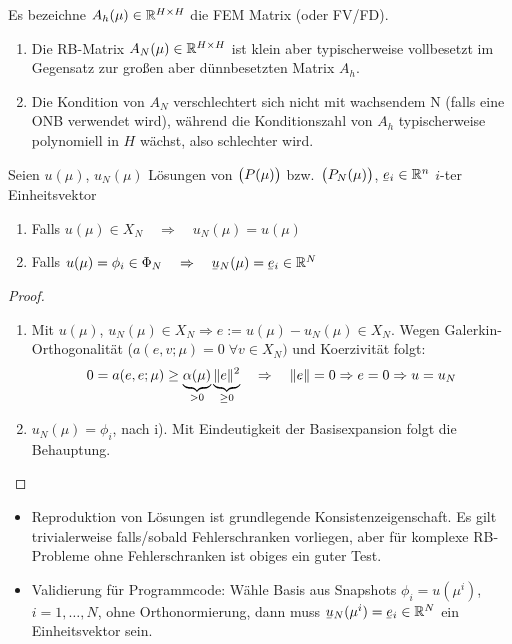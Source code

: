 \begin{bem}
	Es bezeichne $A_h(\mu) \in \mathbb{R}^{H \times H}$ die FEM Matrix (oder FV/FD).
	\begin{enumerate}
		\item Die RB-Matrix $A_N(\mu) \in \mathbb{R}^{H \times H}$ ist klein aber typischerweise vollbesetzt im Gegensatz zur großen aber dünnbesetzten Matrix $A_h$.
		\item Die Kondition von $A_N$ verschlechtert sich nicht mit wachsendem N (falls eine ONB verwendet wird), während die Konditionszahl von $A_h$ typischerweise polynomiell in $H$ wächst, also schlechter wird.
	\end{enumerate}
\end{bem}

\begin{satz} \label{3.8}
	Seien $u(\mu)$, $u_N(\mu)$ Lösungen von $\big(P(\mu)\big)$ bzw.\ $\big(P_N(\mu)\big)$, $\ubar e_i \in \R^n$ $i$-ter Einheitsvektor
	\begin{enumerate}
		\item Falls $u(\mu) \in X_N \quad \Rightarrow \quad u_N(\mu) = u(\mu)$
		\item Falls $u(\mu) = \phi_i \in \Phi_N \quad \Rightarrow \quad \ubar u_N(\mu) = \ubar e_i \in \R^N$
	\end{enumerate}

	\begin{proof} \beginwithlistbew
		\begin{enumerate}
			\item Mit $u(\mu)$, $u_N(\mu) \in X_N \Rightarrow e := u(\mu) - u_N(\mu) \in X_N$.
				Wegen Galerkin-Orthogonalität ($a(e,v;\mu) = 0 \; \forall v \in X_N)$ und Koerzivität folgt:
				\[
					0 = a(e,e;\mu) \geq \underbrace{\alpha(\mu)}_{> 0} \underbrace{\|e\|^2}_{\geq 0} \quad \Rightarrow \quad \|e\| = 0 \Rightarrow e = 0 \Rightarrow u = u_N
				\]
			\item $u_N(\mu) = \phi_i$, nach i).
				Mit Eindeutigkeit der Basisexpansion folgt die Behauptung.
		\end{enumerate}
	\end{proof}
\end{satz}

\begin{bem} \beginwithlistbem
	\begin{itemize}
		\item Reproduktion von Lösungen ist grundlegende Konsistenzeigenschaft.
			Es gilt trivialerweise falls/sobald Fehlerschranken vorliegen, aber für komplexe RB-Probleme ohne Fehlerschranken ist obiges ein guter Test.
		\item Validierung für Programmcode: Wähle Basis aus Snapshots $\phi_i = u(\mu^i)$, $i=1,\dots,N$, ohne Orthonormierung, dann muss $\ubar u_N(\mu^i) = \ubar e_i \in \R^N$ ein Einheitsvektor sein.
	\end{itemize}
\end{bem}

